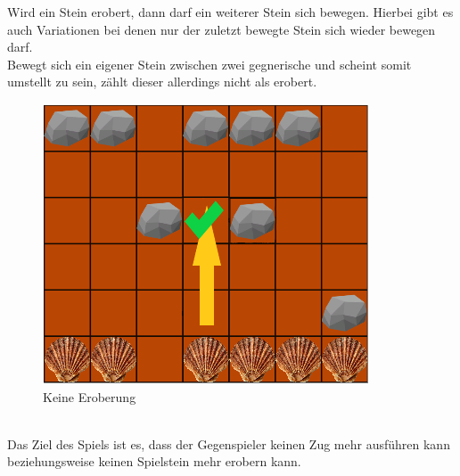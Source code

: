 Wird ein Stein erobert, dann darf ein weiterer Stein sich bewegen. Hierbei gibt es auch Variationen bei denen nur der zuletzt bewegte Stein sich wieder bewegen darf.\\
Bewegt sich ein eigener Stein zwischen zwei gegnerische und scheint somit umstellt zu sein, zählt dieser allerdings nicht als erobert.\\
\begin{figure}[h]
	\centering
	\includegraphics{img/regeln_nichterobert}
	\caption{Keine Eroberung}
	\label{fig:nichterobern}
\end{figure}
\\
Das Ziel des Spiels ist es, dass der Gegenspieler keinen Zug mehr ausführen kann beziehungsweise keinen Spielstein mehr erobern kann.




